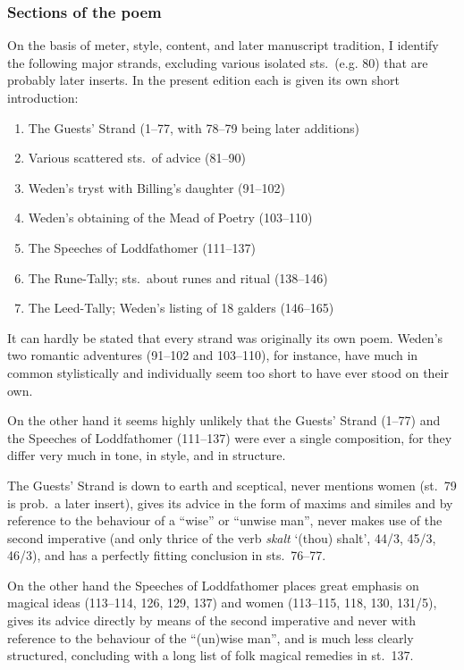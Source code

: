 \subsubsection{Sections of the poem}

On the basis of meter, style, content, and later manuscript tradition, I identify the following major strands, excluding various isolated sts.~(e.g. 80) that are probably later inserts.  In the present edition each is given its own short introduction:

\begin{enumerate}
	\item The Guests’ Strand (1--77, with 78--79 being later additions)
  \item Various scattered sts.~of advice (81--90)
  \item Weden’s tryst with Billing’s daughter (91--102)
  \item Weden’s obtaining of the Mead of Poetry (103--110)
  \item The Speeches of Loddfathomer (111--137)
  \item The Rune-Tally; sts.~about runes and ritual (138--146)
  \item The Leed-Tally; Weden’s listing of 18 galders (146--165)
\end{enumerate}

It can hardly be stated that every strand was originally its own poem.  Weden’s two romantic adventures (91--102 and 103--110), for instance, have much in common stylistically and individually seem too short to have ever stood on their own.

On the other hand it seems highly unlikely that the Guests’ Strand (1--77) and the Speeches of Loddfathomer (111--137) were ever a single composition, for they differ very much
in tone, in style, and in structure.

The Guests’ Strand is down to earth and sceptical, never mentions women (st.~79 is prob.~a later insert), gives its advice in the form of maxims and similes and by reference to the behaviour of a “wise” or “unwise man”, never makes use of the second imperative (and only thrice of the verb \emph{skalt} ‘(thou) shalt’, 44/3, 45/3, 46/3), and has a perfectly fitting conclusion in sts.~76--77.

On the other hand the Speeches of Loddfathomer places great emphasis on magical ideas (113--114, 126, 129, 137) and women (113--115, 118, 130, 131/5), gives its advice directly by means of the second imperative and never with reference to the behaviour of the “(un)wise man”, and is much less clearly structured, concluding with a long list of folk magical remedies in st.~137.

